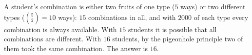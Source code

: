 A student's combination is either two fruits of one type ($5$ ways) or two different types ($\binom52=10$ ways): $15$ combinations in all, and with $2000$ of each type every combination is always available. With $15$ students it is possible that all combinations are different. With $16$ students, by the pigeonhole principle two of them took the same combination. The answer is $\boxed{16}$.
